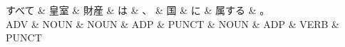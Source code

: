 \documentclass[tikz,border=5pt]{standalone}
\begin{document}
\normalsize
\begin{dependency}[edge unit distance=12.0pt]
    \begin{deptext}[column sep=1em]
        すべて \& 皇室 \& 財産 \& は \& 、 \& 国 \& に \& 属する \& 。\\
        ADV \& NOUN \& NOUN \& ADP \& PUNCT \& NOUN \& ADP \& VERB \& PUNCT\\
    \end{deptext}
\end{dependency}
\end{document}
